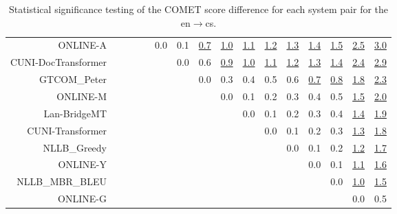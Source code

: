 \documentclass[11pt]{article}
\begin{document}
\begin{sidewaystable}
\begin{center}
{\begin{tabular}{rccccccccccccccc}
ONLINE-A &  &  &  &  & \cellcolor{red!0} 0.0 & \cellcolor{red!0} 0.1 & \cellcolor{red!70} \underline{0.7} & \cellcolor{red!70} \underline{1.0} & \cellcolor{red!70} \underline{1.1} & \cellcolor{red!70} \underline{1.2} & \cellcolor{red!70} \underline{1.3} & \cellcolor{red!70} \underline{1.4} & \cellcolor{red!70} \underline{1.5} & \cellcolor{red!70} \underline{2.5} & \cellcolor{red!70} \underline{3.0}\\ 
CUNI-DocTransformer &  &  &  &  &  & \cellcolor{red!0} 0.0 & \cellcolor{red!60} 0.6 & \cellcolor{red!70} \underline{0.9} & \cellcolor{red!70} \underline{1.0} & \cellcolor{red!70} \underline{1.1} & \cellcolor{red!70} \underline{1.2} & \cellcolor{red!70} \underline{1.3} & \cellcolor{red!70} \underline{1.4} & \cellcolor{red!70} \underline{2.4} & \cellcolor{red!70} \underline{2.9}\\ 
GTCOM\_Peter &  &  &  &  &  &  & \cellcolor{red!0} 0.0 & \cellcolor{red!0} 0.3 & \cellcolor{red!40} 0.4 & \cellcolor{red!60} 0.5 & \cellcolor{red!60} 0.6 & \cellcolor{red!70} \underline{0.7} & \cellcolor{red!70} \underline{0.8} & \cellcolor{red!70} \underline{1.8} & \cellcolor{red!70} \underline{2.3}\\ 
ONLINE-M &  &  &  &  &  &  &  & \cellcolor{red!0} 0.0 & \cellcolor{red!0} 0.1 & \cellcolor{red!0} 0.2 & \cellcolor{red!0} 0.3 & \cellcolor{red!50} 0.4 & \cellcolor{red!60} 0.5 & \cellcolor{red!70} \underline{1.5} & \cellcolor{red!70} \underline{2.0}\\ 
Lan-BridgeMT &  &  &  &  &  &  &  &  & \cellcolor{red!0} 0.0 & \cellcolor{red!0} 0.1 & \cellcolor{red!0} 0.2 & \cellcolor{red!30} 0.3 & \cellcolor{red!60} 0.4 & \cellcolor{red!70} \underline{1.4} & \cellcolor{red!70} \underline{1.9}\\ 
CUNI-Transformer &  &  &  &  &  &  &  &  &  & \cellcolor{red!0} 0.0 & \cellcolor{red!0} 0.1 & \cellcolor{red!0} 0.2 & \cellcolor{red!0} 0.3 & \cellcolor{red!70} \underline{1.3} & \cellcolor{red!70} \underline{1.8}\\ 
NLLB\_Greedy &  &  &  &  &  &  &  &  &  &  & \cellcolor{red!0} 0.0 & \cellcolor{red!0} 0.1 & \cellcolor{red!30} 0.2 & \cellcolor{red!70} \underline{1.2} & \cellcolor{red!70} \underline{1.7}\\ 
ONLINE-Y &  &  &  &  &  &  &  &  &  &  &  & \cellcolor{red!0} 0.0 & \cellcolor{red!0} 0.1 & \cellcolor{red!70} \underline{1.1} & \cellcolor{red!70} \underline{1.6}\\ 
NLLB\_MBR\_BLEU &  &  &  &  &  &  &  &  &  &  &  &  & \cellcolor{red!0} 0.0 & \cellcolor{red!70} \underline{1.0} & \cellcolor{red!70} \underline{1.5}\\ 
ONLINE-G &  &  &  &  &  &  &  &  &  &  &  &  &  & \cellcolor{red!0} 0.0 & \cellcolor{red!30} 0.5\\ 
\bottomrule 
\end{tabular} }
\caption{Statistical significance testing of the COMET score difference for each system pair for the en$\rightarrow$cs.} 
 \end{center} \end{sidewaystable} 
\end{document}
